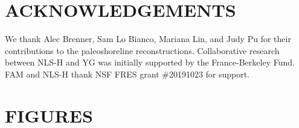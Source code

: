 \documentclass[11pt,letterpaper]{article}
\newcommand{\pCOtwo}{\textit{p}CO$_{2}$\xspace}
\begin{document}

\section*{ACKNOWLEDGEMENTS \label{sec:ACKNOWLEDGEMENTS}}

We thank Alec Brenner, Sam Lo Bianco, Mariana Lin, and Judy Pu for their contributions to the paleoshoreline reconstructions. Collaborative research between NLS-H and YG was initially supported by the France-Berkeley Fund. FAM and NLS-H thank NSF FRES grant \#20191023 for support. 

\clearpage
\newpage

\section*{FIGURES}
\end{document}
